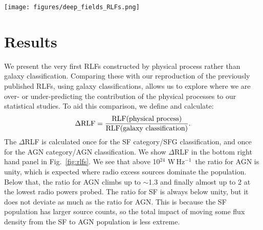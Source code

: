 \documentclass[usenatbib,fleqn,letters]{mnras}
\newcommand{\wphz}{$\,$W$\,$Hz$^{-1}$}
\begin{document}

\begin{figure*}
    \centering
    \texttt{[image: figures/deep\_fields\_RLFs.png]}
    \caption{\textit{Left:} Validation of our re-calculated galaxy RLFs (dotted lines) for the smaller area considered here with the previously published RLFs (solid lines). \textit{Middle:} RLFs calculated by process rather than galaxy. \textit{Right top:} RLFs calculated here by galaxy classifications (dotted lines) and by physical process (solid lines; orange for AGN and green for SF). \textit{Bottom right:} $\Delta$RLF for both AGN and star formation. }
    \label{fig:rlfs}
\end{figure*}


\section{Results}
\label{sec:results}

We present the very first RLFs constructed by physical process rather than galaxy classification. Comparing these with our reproduction of the previously published RLFs, using galaxy classifications, allows us to explore where we are over- or under-predicting the contribution of the physical processes to our statistical studies. To aid this comparison, we define and calculate: 
\begin{equation}
\Delta\textrm{RLF} = \frac{\textrm{RLF(physical process)}}{\textrm{RLF(galaxy classification)}}. \notag
\end{equation}
The $\Delta$RLF is calculated once for the SF category/SFG classification, and once for the AGN category/AGN classification. We show $\Delta$RLF in the bottom right hand panel in Fig.~\ref{fig:rlfs}. We see that above 10$^{24}\,$\wphz\ the ratio for AGN is unity, which is expected where radio excess sources dominate the population. Below that, the ratio for AGN climbs up to $\sim$1.3 and finally almost up to 2 at the lowest radio powers probed. The ratio for SF is always below unity, but it does not deviate as much as the ratio for AGN. This is because the SF population has larger source counts, so the total impact of moving some flux density from the SF to AGN population is less extreme. 
\end{document}

